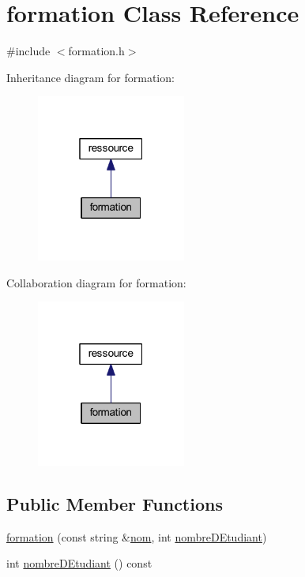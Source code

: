 \hypertarget{classformation}{}\section{formation Class Reference}
\label{classformation}


{\ttfamily \#include $<$formation.\+h$>$}



Inheritance diagram for formation\+:\nopagebreak
\begin{figure}[H]
\begin{center}
\leavevmode
\includegraphics[width=139pt]{classformation__inherit__graph}
\end{center}
\end{figure}


Collaboration diagram for formation\+:\nopagebreak
\begin{figure}[H]
\begin{center}
\leavevmode
\includegraphics[width=139pt]{classformation__coll__graph}
\end{center}
\end{figure}
\subsection*{Public Member Functions}
\begin{DoxyCompactItemize}
\item 
\hyperlink{classformation_af34ced9e0539ebc32d9f87a79e3b383a}{formation} (const string \&\hyperlink{classressource_aff712b6d732b3f4091dd29f4349aba85}{nom}, int \hyperlink{classformation_ad2cf7556c2c72212e1305a287ce25580}{nombre\+D\+Etudiant})
\item 
int \hyperlink{classformation_ad2cf7556c2c72212e1305a287ce25580}{nombre\+D\+Etudiant} () const
\end{DoxyCompactItemize}


